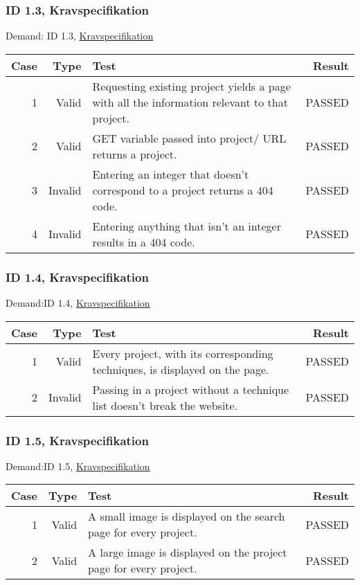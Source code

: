 \documentclass{TDP003mall}
\begin{document}
\subsubsection{ID 1.3, Kravspecifikation}
Demand: ID 1.3, \href{https://www.ida.liu.se/~TDP003/current/projekt/dokument/systemspecifikation.pdf}{Kravspecifikation}
\begin{table}[!h]
\begin{tabularx}{\linewidth}{|r|r|X|r|}\hline
\textbf{Case} &\textbf{Type} & \textbf{Test} & \textbf{Result} \\\hline
1 &Valid & Requesting existing project yields a page with all the information relevant to that project. & PASSED \\\hline
2 &Valid & GET variable passed into  project/ URL returns a project.  & PASSED\\\hline
3 &Invalid & Entering an integer that doesn't correspond to a project returns a 404 code.  & PASSED \\\hline
4 &Invalid & Entering anything that isn't an integer results in a 404 code. & PASSED \\\hline
\end{tabularx}
\end{table}


\subsubsection{ID 1.4, Kravspecifikation}
Demand:ID 1.4, \href{https://www.ida.liu.se/~TDP003/current/projekt/dokument/systemspecifikation.pdf}{Kravspecifikation}
\begin{table}[!h]
\begin{tabularx}{\linewidth}{|r|r|X|r|}\hline
\textbf{Case} &\textbf{Type} & \textbf{Test} & \textbf{Result} \\\hline
1 &Valid & Every project, with its corresponding techniques, is displayed on the page. & PASSED  \\\hline
2 &Invalid & Passing in a project without a technique list doesn't break the
website. & PASSED \\\hline
\end{tabularx}
\end{table}


\subsubsection{ID 1.5, Kravspecifikation}
Demand:ID 1.5, \href{https://www.ida.liu.se/~TDP003/current/projekt/dokument/systemspecifikation.pdf}{Kravspecifikation}
\begin{table}[!h]
\begin{tabularx}{\linewidth}{|r|r|X|r|}\hline
\textbf{Case} &\textbf{Type} & \textbf{Test} & \textbf{Result} \\\hline
1 &Valid & A small image is displayed on the search page for every project. & PASSED \\\hline
2 &Valid & A large image is displayed on the project page for every project. & PASSED \\\hline
\end{tabularx}
\end{table}
\end{document}

